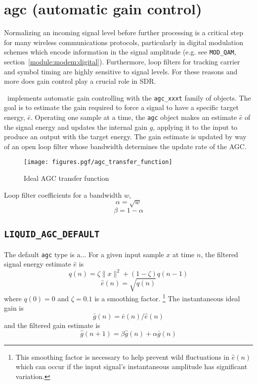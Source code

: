 % 
%

\section{agc (automatic gain control)}
\label{module:agc}
Normalizing an incoming signal level before further processing is a critical
step for many wireless communications protocols, particularly in digital
modulation schemes which encode information in the signal amplitude (e.g. see
{\tt MOD\_QAM}, section~\ref{module:modem:digital}).
Furthermore, loop filters for tracking carrier and symbol timing are highly
sensitive to signal levels.
For these reasons and more does gain control play a crucial role in SDR.

\liquid\ implements automatic gain controlling with the {\tt agc\_xxxt}
family of objects.
The goal is to estimate the gain required to force a signal to have a specific
target energy, $\bar{e}$.
Operating one sample at a time, the {\tt agc} object makes an estimate
$\hat{e}$ of the signal energy and updates the internal gain $\hat{g}$,
applying it to the input to produce an output with the target energy.
The gain estimate is updated by way of an open loop filter whose bandwidth
determines the update rate of the AGC.

\begin{figure}
\centering
  \texttt{[image: figures.pgf/agc\_transfer\_function]}
\caption{Ideal AGC transfer function}
\label{fig:module:agc:transfer_function}
\end{figure}


Loop filter coefficients for a bandwidth $w$,
\[  \alpha = \sqrt{w}   \]
\[  \beta = 1 - \alpha  \]

\subsection{{\tt LIQUID\_AGC\_DEFAULT}}
The default {\tt agc} type is a... For a given input sample $x$ at time $n$,
the filtered signal energy estimate $\hat{e}$ is
\[  q(n) = \zeta\|x\|^2 + (1-\zeta)q(n-1)   \]
\[  \hat{e}(n) = \sqrt{q(n)}                \]
where $q(0)=0$ and $\zeta=0.1$ is a smoothing factor.%
\footnote{This smoothing factor is necessary to help prevent wild fluctuations
in $\hat{e}(n)$ which can occur if the input signal's instantaneous amplitude
has significant variation.}
The instantaneous ideal gain is
\[
    \bar{g}(n) = \bar{e}(n) / \hat{e}(n)
\]
and the filtered gain estimate is
\[
    \hat{g}(n+1) = \beta \hat{g}(n) + \alpha \bar{g}(n)
\]

